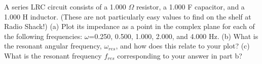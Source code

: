 A series LRC circuit consists of a 1.000 $\Omega$ resistor, a
        1.000 F capacitor, and a 1.000 H inductor. (These are
        not particularly easy values to find on the shelf at Radio Shack!)\hwendpart
        (a) Plot its impedance as a point in the complex plane for each of
        the following frequencies: $\omega$=0.250, 0.500, 1.000, 2.000, and 4.000 Hz.\hwendpart
        (b) What is the resonant angular frequency, $\omega_{res}$, 
        and how does this relate to your plot?\answercheck\hwendpart
        (c) What is the resonant frequency $f_{res}$ corresponding to your answer in part b?\answercheck

